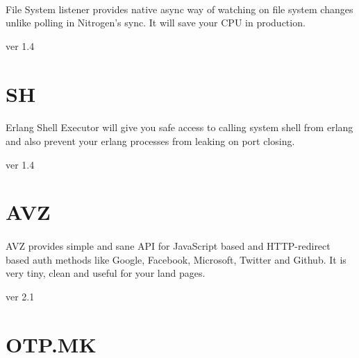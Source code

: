 \documentclass[11pt]{article}
\begin{document}
\paragraph{}
File System listener provides native async way of watching on
file system changes unlike polling in Nitrogen's sync. It will save
your CPU in production.

 ver 1.4

\section*{SH}
\paragraph{}
Erlang Shell Executor will give you safe access to calling system shell
from erlang and also prevent your erlang processes from leaking on port closing.

 ver 1.4

\section*{AVZ}
\paragraph{}
AVZ provides simple and sane API for JavaScript based and HTTP-redirect
based auth methods like Google, Facebook, Microsoft, Twitter and Github.
It is very tiny, clean and useful for your land pages.

 ver 2.1


\section*{OTP.MK}
\paragraph{}
\end{document}
